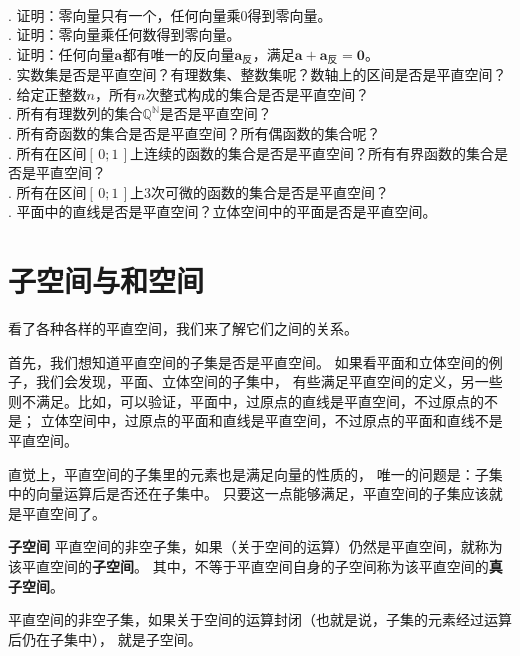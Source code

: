 \documentclass[12pt,UTF8,fontset=none]{ctexbook}
\begin{document}
\begin{xt}
    \mbox{} \\
    . 证明：零向量只有一个，任何向量乘$0$得到零向量。\\
    . 证明：零向量乘任何数得到零向量。\\
    . 证明：任何向量$\mathbf{a}$都有唯一的反向量$\mathbf{a}_{\text{反}}$，满足$\mathbf{a} + \mathbf{a}_{\text{反}} = \mathbf{0}$。\\
    . 实数集是否是平直空间？有理数集、整数集呢？数轴上的区间是否是平直空间？\\
    . 给定正整数$n$，所有$n$次整式构成的集合是否是平直空间？\\
    . 所有有理数列的集合$\mathbb{Q}^\mathbb{N}$是否是平直空间？\\
    . 所有奇函数的集合是否是平直空间？所有偶函数的集合呢？\\
    . 所有在区间$[\,0;1\,]$上连续的函数的集合是否是平直空间？所有有界函数的集合是否是平直空间？\\
    . 所有在区间$[\,0;1\,]$上$3$次可微的函数的集合是否是平直空间？\\
    . 平面中的直线是否是平直空间？立体空间中的平面是否是平直空间。
\end{xt}

\section{子空间与和空间}
看了各种各样的平直空间，我们来了解它们之间的关系。

首先，我们想知道平直空间的子集是否是平直空间。
如果看平面和立体空间的例子，我们会发现，平面、立体空间的子集中，
有些满足平直空间的定义，另一些则不满足。比如，可以验证，平面中，过原点的直线是平直空间，不过原点的不是；
立体空间中，过原点的平面和直线是平直空间，不过原点的平面和直线不是平直空间。

直觉上，平直空间的子集里的元素也是满足向量的性质的，
唯一的问题是：子集中的向量运算后是否还在子集中。
只要这一点能够满足，平直空间的子集应该就是平直空间了。

\begin{df}{\textbf{子空间}}
    平直空间的非空子集，如果（关于空间的运算）仍然是平直空间，就称为该平直空间的\textbf{子空间}。
    其中，不等于平直空间自身的子空间称为该平直空间的\textbf{真子空间}。
\end{df}

\begin{tm}
    平直空间的非空子集，如果关于空间的运算封闭（也就是说，子集的元素经过运算后仍在子集中），
    就是子空间。
\end{tm}
\end{document}
